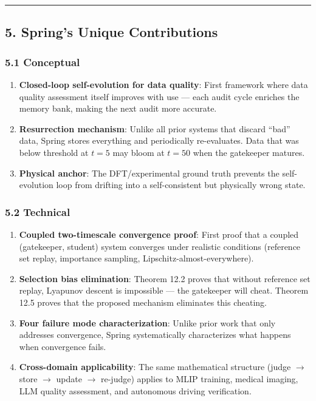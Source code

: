 \documentclass[
  12pt,
]{article}
\providecommand{\tightlist}{%
  \setlength{\itemsep}{0pt}\setlength{\parskip}{0pt}}
\begin{document}
\begin{center}\rule{0.5\linewidth}{0.5pt}\end{center}

\subsection{5. Spring's Unique Contributions}\label{springs-unique-contributions}

\subsubsection{5.1 Conceptual}\label{conceptual}

\begin{enumerate}
\def\labelenumi{\arabic{enumi}.}
\tightlist
\item \textbf{Closed-loop self-evolution for data quality}: First framework where data quality assessment itself improves with use --- each audit cycle enriches the memory bank, making the next audit more accurate.
\item \textbf{Resurrection mechanism}: Unlike all prior systems that discard ``bad'' data, Spring stores everything and periodically re-evaluates. Data that was below threshold at $t=5$ may bloom at $t=50$ when the gatekeeper matures.
\item \textbf{Physical anchor}: The DFT/experimental ground truth prevents the self-evolution loop from drifting into a self-consistent but physically wrong state.
\end{enumerate}

\subsubsection{5.2 Technical}\label{technical}

\begin{enumerate}
\def\labelenumi{\arabic{enumi}.}
\tightlist
\item \textbf{Coupled two-timescale convergence proof}: First proof that a coupled (gatekeeper, student) system converges under realistic conditions (reference set replay, importance sampling, Lipschitz-almost-everywhere).
\item \textbf{Selection bias elimination}: Theorem 12.2 proves that without reference set replay, Lyapunov descent is impossible --- the gatekeeper will cheat. Theorem 12.5 proves that the proposed mechanism eliminates this cheating.
\item \textbf{Four failure mode characterization}: Unlike prior work that only addresses convergence, Spring systematically characterizes what happens when convergence fails.
\item \textbf{Cross-domain applicability}: The same mathematical structure (judge $\to$ store $\to$ update $\to$ re-judge) applies to MLIP training, medical imaging, LLM quality assessment, and autonomous driving verification.
\end{enumerate}
\end{document}
